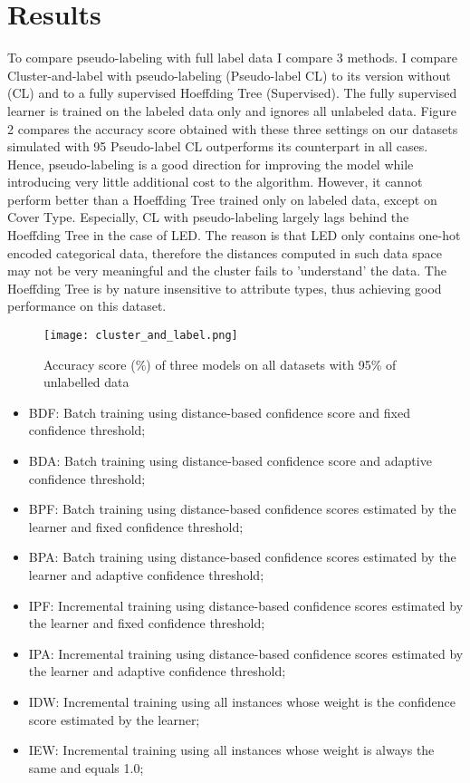 \documentclass[twocolumn]{article}
\begin{document}
    \section*{Results}
    To compare pseudo-labeling with full label data I compare 3 methods.
    I compare Cluster-and-label with pseudo-labeling (Pseudo-label CL) to its version without (CL) and to a fully supervised Hoeffding Tree (Supervised).
    The fully supervised learner is trained on the labeled data only and ignores all unlabeled data.
    Figure 2 compares the accuracy score obtained with these three settings on our datasets simulated with 95%
    Pseudo-label CL outperforms its counterpart in all cases.
    Hence, pseudo-labeling is a good direction for improving the model while introducing very little additional cost to the algorithm.
    However, it cannot perform better than a Hoeffding Tree trained only on labeled data, except on Cover Type. Especially, CL with pseudo-labeling largely lags behind the Hoeffding Tree in the case of LED.
    The reason is that LED only contains one-hot encoded categorical data, therefore the distances computed in such data space may not be very meaningful and the cluster fails to 'understand' the data.
    The Hoeffding Tree is by nature insensitive to attribute types, thus achieving good performance on this dataset.

    \begin{center}
        \begin{figure}
            \texttt{[image: cluster\_and\_label.png]}
            \caption{Accuracy score (\%) of three models on all datasets with 95\% of unlabelled data}
            \label{fig:cluster_and_label}
        \end{figure}
    \end{center}

    \begin{itemize}
        \item BDF: Batch training using distance-based confidence score and fixed confidence threshold;
        \item BDA: Batch training using distance-based confidence score and adaptive confidence threshold;
        \item BPF: Batch training using distance-based confidence scores estimated by the learner and fixed confidence threshold;
        \item BPA: Batch training using distance-based confidence scores estimated by the learner and adaptive confidence threshold;
        \item IPF: Incremental training using distance-based confidence scores estimated by the learner and fixed confidence threshold;
        \item IPA: Incremental training using distance-based confidence scores estimated by the learner and adaptive confidence threshold;
        \item IDW: Incremental training using all instances whose weight is the confidence score estimated by the learner;
        \item IEW: Incremental training using all instances whose weight is always the same and equals 1.0;
    \end{itemize}
\end{document}
